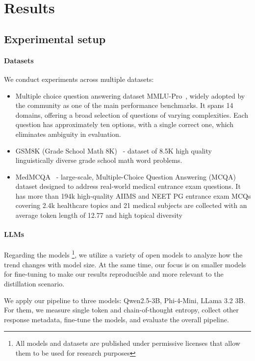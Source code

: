 \section{Results}

\subsection{Experimental setup}

\paragraph{Datasets}
We conduct experiments across multiple datasets: 

\begin{itemize}
    \item Multiple choice question answering dataset MMLU-Pro~\cite{wang2024mmluprorobustchallengingmultitask},  widely adopted by the community as one of the main performance benchmarks. 
    It spans 14 domains, offering a broad selection of questions of varying complexities. 
    Each question has approximately ten options, with a single correct one, which eliminates ambiguity in evaluation.
    \item GSM8K (Grade School Math 8K)~\cite{cobbe2021gsm8k} - dataset of 8.5K high quality linguistically diverse grade school math word problems.
    \item MedMCQA~\cite{pmlr-v174-pal22a} - large-scale, Multiple-Choice Question Answering (MCQA) dataset designed to address real-world medical entrance exam questions. It has more than 194k high-quality AIIMS and NEET PG entrance exam MCQs covering 2.4k healthcare topics and 21 medical subjects are collected with an average token length of 12.77 and high topical diversity
\end{itemize}


\paragraph{LLMs}
Regarding the models \footnote{All models and datasets are published under permissive licenses that allow them to be used for research purposes}, we utilize a variety of open models to analyze how the trend changes with model size. 
At the same time, our focus is on smaller models for fine-tuning to make our results reproducible and more relevant to the distillation scenario.

We apply our pipeline to three models: 
Qwen2.5-3B, Phi-4-Mini, LLama 3.2 3B.
For them, we measure single token and chain-of-thought entropy, collect other response metadata, fine-tune the models, and evaluate the overall pipeline.

